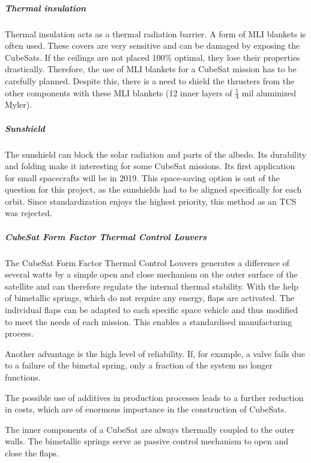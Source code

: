 \subparagraph{Thermal insulation}

Thermal insulation acts as a thermal radiation barrier. A form of MLI blankets is
often used. These covers are very sensitive and can be damaged by exposing the
CubeSats. If the ceilings are not placed 100\% optimal, they lose their properties
drastically. Therefore, the use of MLI blankets for a CubeSat mission has to be
carefully planned. Despite this, there is a need to shield the thrusters from the
other components with these MLI blankets (12 inner layers of $\frac{1}{4}$ mil aluminized Myler).

\subparagraph{Sunshield}

The sunshield can block the solar radiation and parts of the albedo. Its durability
and folding make it interesting for some CubeSat missions. Its first application
for small spacecrafts will be in 2019. This space-saving option is out of the question
for this project, as the sunshields had to be aligned specifically for each orbit.
Since standardization enjoys the highest priority, this method as an TCS was rejected.

\subparagraph{CubeSat Form Factor Thermal Control Louvers}

The CubeSat Form Factor Thermal Control Louvers generates a difference of several
watts by a simple open and close mechanism on the outer surface of the satellite
and can therefore regulate the internal thermal stability. With the help of
bimetallic springs, which do not require any energy, flaps are activated.
The individual flaps can be adapted to each specific space vehicle and thus modified
to meet the needs of each mission. This enables a standardised manufacturing process.

Another advantage is the high level of reliability. If, for example, a valve fails
due to a failure of the bimetal spring, only a fraction of the system no longer functions.

The possible use of additives in production processes leads to a further reduction
in costs, which are of enormous importance in the construction of CubeSats.

The inner components of a CubeSat are always thermally coupled to the outer walls.
The bimetallic springs serve as passive control mechanism to open and close the flaps.

